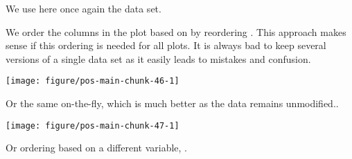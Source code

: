 \documentclass[krantz2]{krantz}\usepackage{knitr}%
\begin{document}
We use here once again the  data set.

We order the columns in the plot based on  by reordering . This approach makes sense if this ordering is needed for all plots. It is always bad to keep several versions of a single data set as it easily leads to mistakes and confusion.

\begin{knitrout}\footnotesize
{}\color{fgcolor}\begin{kframe}
\begin{alltt}
 \hlkwb{<-} 
\hlopt{$} \hlkwb{<-}  \hlstd{(}
  \hlopt{+}
  \hlstd{(} \hlstd{=} \hlstd{,}  
\end{alltt}
\end{kframe}

{\centering \texttt{[image: figure/pos-main-chunk-46-1]} 

}



\end{knitrout}

Or the same on-the-fly, which is much better as the data remains unmodified..

\begin{knitrout}\footnotesize
{}\color{fgcolor}\begin{kframe}
\begin{alltt}
 \hlstd{(}\hlstd{(} \hlopt{+}
  \hlstd{(} \hlstd{=} \hlstd{,}  
\end{alltt}
\end{kframe}

{\centering \texttt{[image: figure/pos-main-chunk-47-1]} 

}



\end{knitrout}

Or ordering based on a different variable, .
\end{document}
